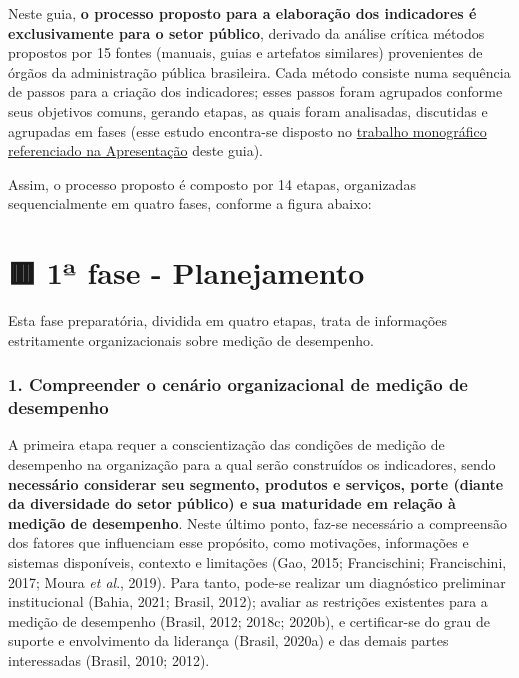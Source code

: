\documentclass[
  letterpaper,
  DIV=11,
  numbers=noendperiod]{scrreprt}
\begin{document}
Neste guia, \textbf{o processo proposto para a elaboração dos
indicadores é exclusivamente para o setor público}, derivado da análise
crítica métodos propostos por 15 fontes (manuais, guias e artefatos
similares) provenientes de órgãos da administração pública brasileira.
Cada método consiste numa sequência de passos para a criação dos
indicadores; esses passos foram agrupados conforme seus objetivos
comuns, gerando etapas, as quais foram analisadas, discutidas e
agrupadas em fases (esse estudo encontra-se disposto no
\href{/o/AZWDclIWFqqJuBEvyQWk/s/ws6bIBOPv2tLRHdwbB7y/~/changes/788/1.-apresentacao\#o-guia-para-a-construcao-de-indicadores-de-desempenho}{trabalho
monográfico referenciado na Apresentação} deste guia).

Assim, o processo proposto é composto por 14 etapas, organizadas
sequencialmente em quatro fases, conforme a figura abaixo:

\hypertarget{uxaa-fase---planejamento}{%
\chapter*{🟥 1ª fase - Planejamento}\label{uxaa-fase---planejamento}}


{Esta fase preparatória, dividida em quatro etapas, trata de informações
estritamente organizacionais sobre medição de desempenho.}

\hypertarget{compreender-o-cenuxe1rio-organizacional-de-mediuxe7uxe3o-de-desempenho}{%
\subsection*{1. Compreender o cenário organizacional de medição de
desempenho}\label{compreender-o-cenuxe1rio-organizacional-de-mediuxe7uxe3o-de-desempenho}}

A primeira etapa requer a conscientização das condições de medição de
desempenho na organização para a qual serão construídos os indicadores,
sendo \textbf{necessário considerar seu segmento, produtos e serviços,
porte (diante da diversidade do setor público) e sua maturidade em
relação à medição de desempenho}. Neste último ponto, faz-se necessário
a compreensão dos fatores que influenciam esse propósito, como
motivações, informações e sistemas disponíveis, contexto e limitações
(Gao, 2015; Francischini; Francischini, 2017; Moura \emph{et al}.,
2019). Para tanto, pode-se realizar um diagnóstico preliminar
institucional (Bahia, 2021; Brasil, 2012); avaliar as restrições
existentes para a medição de desempenho (Brasil, 2012; 2018c; 2020b), e
certificar-se do grau de suporte e envolvimento da liderança (Brasil,
2020a) e das demais partes interessadas (Brasil, 2010; 2012).
\end{document}
